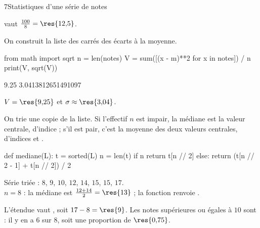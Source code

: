 \begin{corrige}{7}{Statistiques d'une série de notes}
\begin{questions}
  \item {} vaut $\frac{100}{8}=\res{12{,}5}$.
  \item On construit la liste des carrés des écarts à la moyenne.
\begin{codecote}[0.62]
\begin{pythoncol}
from math import sqrt
n = len(notes)
V = sum([(x - m)**2 for x in notes]) / n
print(V, sqrt(V))
\end{pythoncol}
\cote
\begin{consolecol}
9.25 3.0413812651491097
\end{consolecol}

\medskip
$V=\res{9{,}25}$ et $\sigma\approx\res{3{,}04}$.
\end{codecote}
  \item On trie une copie de la liste. Si l'effectif $n$ est impair, la médiane est la valeur centrale, d'indice  ; s'il
    est pair, c'est la moyenne des deux valeurs centrales, d'indices  et .
\begin{codecote}[0.66]
\begin{pythoncol}
def mediane(L):
    t = sorted(L)
    n = len(t)
    if n %
        return t[n // 2]
    else:
        return (t[n // 2 - 1] + t[n // 2]) / 2
\end{pythoncol}
\cote
Série triée : $8$, $9$, $10$, $12$, $14$, $15$, $15$, $17$.\\[1mm]
$n=8$ : la médiane est $\frac{12+14}{2}=\res{13}$ ; la fonction renvoie .
\end{codecote}
  \item L'étendue vaut , soit $17-8=\res{9}$. Les notes supérieures ou égales à $10$ sont
    \code{[x for x in notes if x >= 10]} : il y en a $6$ sur $8$, soit une proportion de $\res{0{,}75}$.
\end{questions}
\end{corrige}

